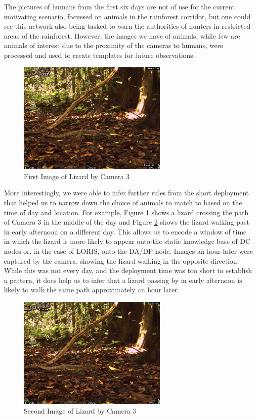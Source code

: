 		The pictures of humans from the first six days are not of use for the current motivating scenario, focussed on animals in the rainforest corridor, but one could see this network also being tasked to warn the authorities of hunters in restricted areas of the rainforest. However, the images we have of animals, while few are animals of interest due to the proximity of the cameras to humans, were processed and used to create templates for future observations. 
		
		    \begin{figure}[h]
		    \centering
			\includegraphics[width=0.65\textwidth]{Chap6/figures/buckeye_img}
		    \caption{First Image of Lizard by Camera 3}
		    \label{buckeye_img}
		    \end{figure}
		
		More interestingly, we were able to infer further rules from the short deployment that helped us to narrow down the choice of animals to match to based on the time of day and location. For example, Figure \ref{buckeye_img} shows a lizard crossing the path of Camera 3 in the middle of the day and Figure \ref{buckeye_img_2} shows the lizard walking past in early afternoon on a different day. This allows us to encode a window of time  in which the lizard is more likely to appear onto the static knowledge base of DC nodes or, in the case of LORIS, onto the DA/DP node. Images an hour later were captured by the camera, showing the lizard walking in the opposite direction. While this was not every day, and the deployment time was too short to establish a pattern, it does help us to infer that a lizard passing by in early afternoon is likely to walk the same path approximately an hour later.
		
		    \begin{figure}[h]
		    \centering
			\includegraphics[width=0.65\textwidth]{Chap6/figures/buckeye_img_2}
		    \caption{Second Image of Lizard by Camera 3}
		    \label{buckeye_img_2}
		    \end{figure}
	
